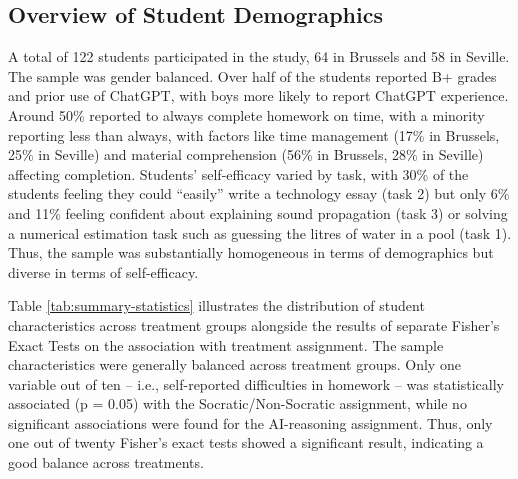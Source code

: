 \documentclass[
  12pt,
]{article}
\begin{document}
\subsection{Overview of Student Demographics}\label{overview-of-student-demographics}

A total of 122 students participated in the study, 64 in Brussels and 58 in Seville. The sample was gender balanced. Over half of the students reported B+ grades and prior use of ChatGPT, with boys more likely to report ChatGPT experience. Around 50\% reported to always complete homework on time, with a minority reporting less than always, with factors like time management (17\% in Brussels, 25\% in Seville) and material comprehension (56\% in Brussels, 28\% in Seville) affecting completion. Students' self-efficacy varied by task, with 30\% of the students feeling they could ``easily'' write a technology essay (task 2) but only 6\% and 11\% feeling confident about explaining sound propagation (task 3) or solving a numerical estimation task such as guessing the litres of water in a pool (task 1). Thus, the sample was substantially homogeneous in terms of demographics but diverse in terms of self-efficacy.

Table \ref{tab:summary-statistics} illustrates the distribution of student characteristics across treatment groups alongside the results of separate Fisher's Exact Tests on the association with treatment assignment. The sample characteristics were generally balanced across treatment groups. Only one variable out of ten -- i.e., self-reported difficulties in homework -- was statistically associated (p = 0.05) with the Socratic/Non-Socratic assignment, while no significant associations were found for the AI-reasoning assignment. Thus, only one out of twenty Fisher's exact tests showed a significant result, indicating a good balance across treatments.
\end{document}
